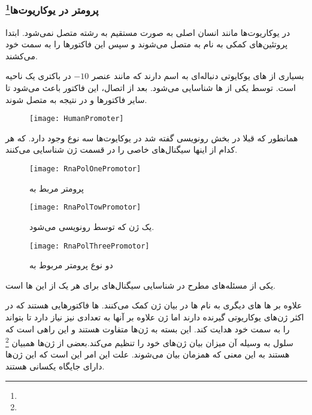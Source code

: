 \subsubsection{پرومتر در یوکاریوت‌ها\protect\footnote{}}
در یوکاریوت‌ها مانند انسان
اصلی به صورت مستقیم به رشته
متصل نمی‌شود. ابتدا پروتئین‌های کمکی به نام
به
 متصل می‌شوند و سپس این فاکتور‌ها
را به سمت خود می‌کشند.

بسیاری از
های یوکایوتی دنباله‌ای به اسم
دارند که مانند عنصر
$ -10 $
در باکتری یک ناحیه
است.
توسط یکی از
ها شناسایی می‌شود. بعد از اتصال،
این فاکتور باعث می‌شود تا سایر فاکتور‌ها و در نتیجه
به
متصل شوند.

\begin{figure}[htbp]
\centering
\texttt{[image: HumanPromoter]}
\caption{}
\end{figure}

همانطور که قبلا در بخش رونویسی گفته شد در یوکایوت‌ها سه نوع
وجود دارد. که هر کدام از اینها سیگنال‌های خاصی را در قسمت
ژن شناسایی می‌کنند.

\begin{figure}[htbp]
\centering
\texttt{[image: RnaPolOnePromotor]}
\caption{پرومتر مربط به
}
\end{figure}

\begin{figure}[htbp]
\centering
\texttt{[image: RnaPolTowPromotor]}
\caption{یک ژن که توسط
رونویسی می‌شود.}
\end{figure}

\begin{figure}[htbp]
\centering
\texttt{[image: RnaPolThreePromotor]}
\caption{دو نوع پرومتر مربوط به
}
\end{figure}

یکی از مسئله‌های مطرح در
شناسایی سیگنال‌های
برای هر یک از این
ها است.

علاوه بر
ها
های دیگری به نام
ها در بیان ژن کمک می‌کنند.
ها فاکتور‌هایی هستند که در اکثر ژن‌های یوکاریوتی گیرنده دارند اما ژن علاوه بر آنها به تعدادی
نیز نیاز دارد تا بتواند
را به سمت خود هدایت کند. این
بسته به ژن‌ها متفاوت هستند و این راهی است که سلول به وسیله آ‌ن میزان بیان ژن‌های خود را تنظیم می‌کند.بعضی از ژن‌ها همبیان
\footnote{}
هستند به این معنی که همزمان بیان می‌شوند. علت این امر این است که این ژن‌ها دارای جایگاه
یکسانی هستند.

